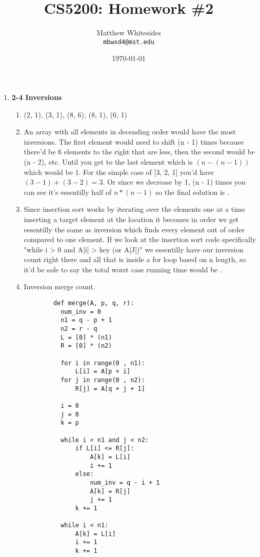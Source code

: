 \documentclass{article}
\title{CS5200: Homework \#2} %
\author{Matthew Whitesides\\ \texttt{mbwxd4@mst.edu}} %
\date{\today} %
\begin{document}
  \maketitle %
 
  \begin{enumerate}
    \item \textbf{2-4 Inversions}
    \begin{enumerate}
      \item (2, 1), (3, 1), (8, 6), (8, 1), (6, 1)
      \item An array with all elements in decending order would have the most inversions. The first element would need to shift (n - 1) times because there'd be 6 elements to the right that are less, then the second would be (n - 2), etc. Until you get to the last element which is $(n - (n - 1))$ which would be 1. For the simple case of [3, 2, 1] you'd have $(3 - 1)  + (3 - 2) = 3$. Or since we decrease by 1, (n - 1) times you can see it's essentilly half of $n * (n -1)$ so the final solution is .
      \item Since insertion sort works by iterating over the elements one at a time inserting a target element at the location it becomes in order we get essentilly the same as inversion which finds every element out of order compared to one element. If we look at the insertion sort code specifically "while i > 0 and A[i] > key (or A[J])" we essentilly have our inversion count right there and all that is inside a for loop based on n length, so it'd be safe to say the total worst case running time would be .
      \item Inversion merge count.
      \begin{lstlisting}
        def merge(A, p, q, r): 
          num_inv = 0
          n1 = q - p + 1
          n2 = r - q 
          L = [0] * (n1) 
          R = [0] * (n2) 
          
          for i in range(0 , n1): 
              L[i] = A[p + i] 
          for j in range(0 , n2): 
              R[j] = A[q + j + 1] 
      
          i = 0
          j = 0
          k = p
      
          while i < n1 and j < n2: 
              if L[i] <= R[j]: 
                  A[k] = L[i] 
                  i += 1
              else:
                  num_inv = q - i + 1
                  A[k] = R[j] 
                  j += 1
              k += 1
      
          while i < n1: 
              A[k] = L[i] 
              i += 1
              k += 1
      

\end{lstlisting}
\end{enumerate}
\end{enumerate}
\end{document}
